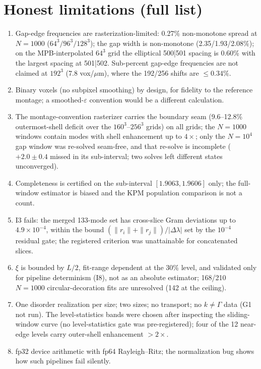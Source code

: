 \documentclass[aps,prl,preprint,superscriptaddress,longbibliography,nofootinbib]{revtex4-2}
\begin{document}
\section{Honest limitations (full list)}
\begin{enumerate}
\item Gap-edge frequencies are rasterization-limited: 0.27\% non-monotone spread at $N=1000$ ($64^3/96^3/128^3$); the gap width is non-monotone (2.35/1.93/2.08\%); on the MPB-interpolated $64^3$ grid the elliptical 500|501 spacing is 0.60\% with the largest spacing at 501|502. Sub-percent gap-edge frequencies are not claimed at $192^3$ (7.8 vox/$\mu$m), where the 192/256 shifts are $\le0.34\%$.
\item Binary voxels (no subpixel smoothing) by design, for fidelity to the reference montage; a smoothed-$\varepsilon$ convention would be a different calculation.
\item The montage-convention rasterizer carries the boundary seam (9.6--12.8\% outermost-shell deficit over the $160^3$--$256^3$ grids) on all grids; the $N=1000$ windows contain modes with shell enhancement up to $4\times$; only the $N=10^4$ gap window was re-solved seam-free, and that re-solve is incomplete ($+2.0\pm0.4$ missed in its sub-interval; two solves left different states unconverged).
\item Completeness is certified on the sub-interval $[1.9063,1.9606]$ only; the full-window estimator is biased and the KPM population comparison is not a count.
\item I3 fails: the merged 133-mode set has cross-slice Gram deviations up to $4.9\times10^{-4}$, within the bound $(\|r_i\|+\|r_j\|)/|\Delta\lambda|$ set by the $10^{-4}$ residual gate; the registered criterion was unattainable for concatenated slices.
\item $\xi$ is bounded by $L/2$, fit-range dependent at the 30\% level, and validated only for pipeline determinism (I8), not as an absolute estimator; 168/210 $N=1000$ circular-decoration fits are unresolved (142 at the ceiling).
\item One disorder realization per size; two sizes; no transport; no $k\ne\Gamma$ data (G1 not run). The level-statistics bands were chosen after inspecting the sliding-window curve (no level-statistics gate was pre-registered); four of the 12 near-edge levels carry outer-shell enhancement $>2\times$.
\item fp32 device arithmetic with fp64 Rayleigh--Ritz; the normalization bug shows how such pipelines fail silently.

\end{enumerate}
\end{document}
